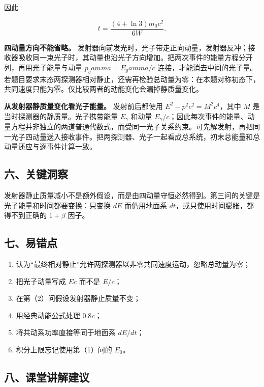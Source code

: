 \documentclass[12pt,a4paper,UTF8]{ctexart}
\newcommand{\tightlist}{\setlength{\itemsep}{0pt}\setlength{\parskip}{0pt}}
\begin{document}
因此

\[
\boxed{t=\frac{(4+\ln3)m_0c^2}{6W}}.
\tag{15}
\]

\textbf{四动量方向不能省略。}
发射器向前发光时，光子带走正向动量，发射器反冲；接收器吸收同一束光子时，其动量也沿光子方向增加。把两次事件的能量方程分开列，再用光子能量与动量
\(p_gamma=E_gamma/c\)
连接，才能消去中间的光子量。若题目要求末态两探测器相对静止，还需再检验总动量为零：在本题对称初态下，共同速度只能为零。仅比较两者的动能变化会漏掉静质量变化。

\textbf{从发射器静质量变化看光子能量。} 发射前后都使用
\(E^2-p^2c^2=M^2c^4\)，其中 \(M\) 是当时探测器的静质量。光子携带能量
\(E_\gamma\) 和动量
\(E_\gamma/c\)；因此每次事件的能量、动量方程并非独立的两道普通代数式，而受同一光子关系约束。可先解发射，再把同一光子四动量送入接收事件。把两探测器、光子一起看成总系统，初末总能量和总动量还应与逐事件计算一致。

\subsection{六、关键洞察}\label{ux516dux5173ux952eux6d1eux5bdf-3}

发射器静止质量减小不是额外假设，而是由四动量守恒必然得到。第三问的关键是光子能量和时间都要变换：只变换
\(dE\) 而仍用地面系 \(dt\)，或只使用时间膨胀，都得不到正确的 \(1+\beta\)
因子。

\subsection{七、易错点}\label{ux4e03ux6613ux9519ux70b9-3}

\begin{enumerate}
\def\labelenumi{\arabic{enumi}.}
\tightlist
\item
  认为``最终相对静止''允许两探测器以非零共同速度运动，忽略总动量为零；
\item
  把光子动量写成 \(Ec\) 而不是 \(E/c\)；
\item
  在第（2）问假设发射器静止质量不变；
\item
  用经典动能公式处理 \(0.8c\)；
\item
  将共动系功率直接等同于地面系 \(dE/dt\)；
\item
  积分上限忘记使用第（1）问的 \(E_0\)。
\end{enumerate}

\subsection{八、课堂讲解建议}\label{ux516bux8bfeux5802ux8bb2ux89e3ux5efaux8bae-3}
\end{document}
